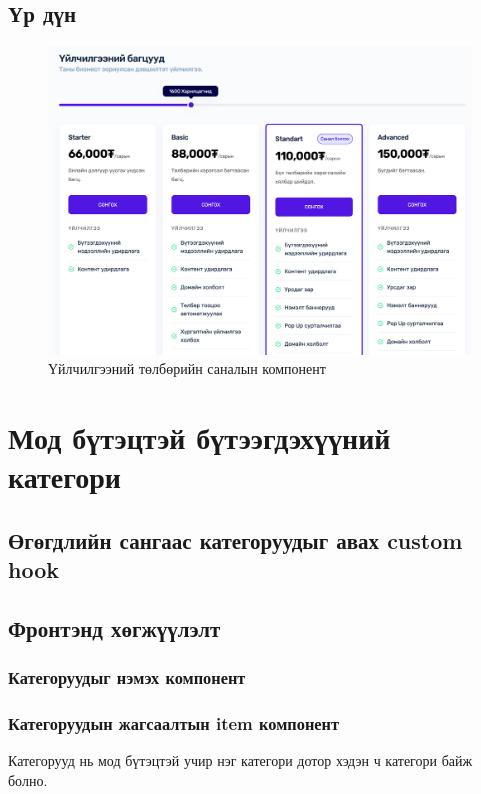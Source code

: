 \subsection{Үр дүн}
\begin{figure}[h]
	\centering
	\includegraphics[scale=0.2]{src/images/pricing.png}
	\caption{Үйлчилгээний төлбөрийн саналын компонент}
\end{figure}

\section{Мод бүтэцтэй бүтээгдэхүүний категори}
\subsection{Өгөгдлийн сангаас категоруудыг авах custom hook}


\subsection{Фронтэнд хөгжүүлэлт}
\subsubsection{Категоруудыг нэмэх компонент}

\subsubsection{Категоруудын жагсаалтын item компонент}
Категорууд нь мод бүтэцтэй учир нэг категори дотор хэдэн ч категори байж болно.


